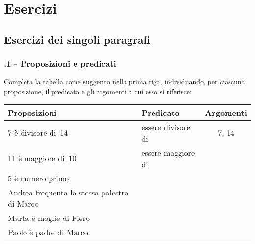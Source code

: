 \section{Esercizi}
\subsection{Esercizi dei singoli paragrafi}
\subsubsection*{\thechapter.1 - Proposizioni e predicati}

\begin{esercizio}
\label{ese:B.1}
Completa la tabella come suggerito nella prima riga, individuando, per ciascuna proposizione, il predicato e gli argomenti a cui esso si riferisce:
\begin{center}
\begin{tabular}{llc}
\toprule
Proposizioni & Predicato & Argomenti\\
\midrule
7 è divisore di~14 & essere divisore di & 7, 14 \\
11 è maggiore di~10 & essere maggiore di & \\
5 è numero primo & & \\
Andrea frequenta la stessa palestra di Marco & & \\
Marta è moglie di Piero & & \\
Paolo è padre di Marco & & \\
\bottomrule
\end{tabular}
\end{center}
\end{esercizio}


